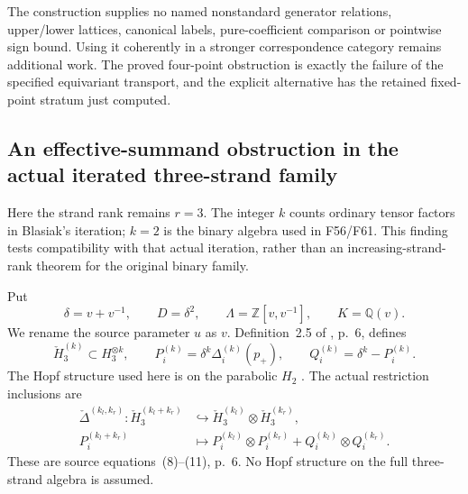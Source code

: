 \documentclass[11pt,a4paper]{article}
\newcommand{\fid}[1]{\textsf{#1}}\newcommand{\gate}[1]{\textsf{#1}}
\theoremstyle{named}\newtheorem{finding}{Finding}[section]
\theoremstyle{definition}\newtheorem{definition}[finding]{Definition}
\theoremstyle{remark}\newtheorem{remark}[finding]{Remark}
\begin{document}
The construction supplies no named nonstandard
generator relations, upper/lower lattices,
canonical labels, pure-coefficient comparison
or pointwise sign bound.
Using it coherently in a stronger correspondence
category remains additional work.
The proved four-point obstruction is exactly the
failure of the specified equivariant transport,
and the explicit alternative has the retained
fixed-point stratum just computed.

\subsection{An effective-summand obstruction in the actual iterated three-strand family}

Here the strand rank remains \(r=3\). The integer \(k\) counts
ordinary tensor factors in Blasiak's iteration; \(k=2\) is the
binary algebra used in \fid{F56}/\fid{F61}. This finding tests
compatibility with that actual iteration, rather than an
increasing-strand-rank theorem for the original binary family.

Put
\[
 \delta=v+v^{-1},\qquad D=\delta^2,\qquad
 \Lambda=\mathbb Z[v,v^{-1}],\qquad K=\mathbb Q(v).
\]
We rename the source parameter \(u\) as \(v\).
Definition~2.5 of \cite{BlasiakChebyshev}, p.~6, defines
\[
 \check H_3^{(k)}\subset H_3^{\otimes k},\qquad
 P_i^{(k)}=\delta^k\Delta_i^{(k)}(p_+),\qquad
 Q_i^{(k)}=\delta^k-P_i^{(k)}.
\]
The Hopf structure used here is on the parabolic \(H_2\)
\cite[Proposition~2.3, pp.~4--5]{BlasiakChebyshev}.
The actual restriction inclusions are
\begin{equation}\label{eq:iteratedActualCoproduct}
 \begin{split}
 \check\Delta^{(k_l,k_r)}:\check H_3^{(k_l+k_r)}
     &\hookrightarrow
       \check H_3^{(k_l)}\otimes\check H_3^{(k_r)},\\
 P_i^{(k_l+k_r)}
     &\longmapsto P_i^{(k_l)}\otimes P_i^{(k_r)}
                   +Q_i^{(k_l)}\otimes Q_i^{(k_r)}.
 \end{split}
\end{equation}
These are source equations~(8)--(11), p.~6. No Hopf structure
on the full three-strand algebra is assumed.
\end{document}
